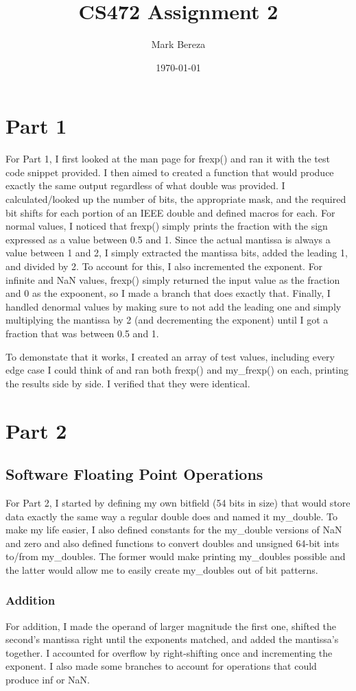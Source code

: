 \documentclass[12pt]{article}%
\begin{document}
\title{CS472 Assignment 2}
\author{Mark Bereza}
\date{\today}
\maketitle
\section{Part 1}
For Part 1, I first looked at the man page for frexp() and ran it with the test code snippet provided. I then aimed to created a function that would produce exactly the same output regardless of what double was provided. I calculated/looked up the number of bits, the appropriate mask, and the required bit shifts for each portion of an IEEE double and defined macros for each. For normal values, I noticed that frexp() simply prints the fraction with the sign expressed as a value between 0.5 and 1. Since the actual mantissa is always a value between 1 and 2, I simply extracted the mantissa bits, added the leading 1, and divided by 2. To account for this, I also incremented the exponent. For infinite and NaN values, frexp() simply returned the input value as the fraction and 0 as the expoonent, so I made a branch that does exactly that. Finally, I handled denormal values by making sure to not add the leading one and simply multiplying the mantissa by 2 (and decrementing the exponent) until I got a fraction that was between 0.5 and 1.


To demonstate that it works, I created an array of test values, including every edge case I could think of and ran both frexp() and my\_frexp() on each, printing the results side by side. I verified that they were identical.
\section{Part 2}
\subsection{Software Floating Point Operations}
For Part 2, I started by defining my own bitfield (54 bits in size) that would store data exactly the same way a regular double does and named it my\_double. To make my life easier, I also defined constants for the my\_double versions of NaN and zero and also defined functions to convert doubles and unsigned 64-bit ints to/from my\_doubles. The former would make printing my\_doubles possible and the latter would allow me to easily create my\_doubles out of bit patterns.
\subsubsection{Addition}
For addition, I made the operand of larger magnitude the first one, shifted the second's mantissa right until the exponents matched, and added the mantissa's together. I accounted for overflow by right-shifting once and incrementing the exponent. I also made some branches to account for operations that could produce inf or NaN.
\end{document}
